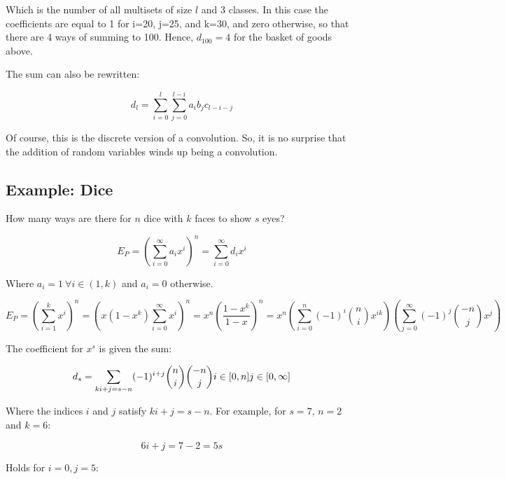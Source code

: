 Which is the number of all multisets of size $l$ and 3 classes. In this case the coefficients are equal to 1 for i=20, j=25, and k=30, and zero otherwise, so that there are 4 ways of summing to 100. Hence, $d_{100} = 4$ for the basket of goods above.

The sum can also be rewritten:

\begin{equation}
d_l = \sum^l_{i=0}\sum^{l-i}_{j=0} a_i b_j c_{l-i-j}
\end{equation}


Of course, this is the discrete version of a convolution. So, it is no surprise that the addition of random variables winds up being a convolution.


\subsection{Example: Dice}

How many ways are there for $n$ dice with $k$ faces to show $s$ eyes?

\begin{equation}
E_P = \left(\sum_{i=0}^\infty a_i x^i\right)^n = \sum_{i=0}^{\infty}d_i x^i
\end{equation}

Where $a_i = 1\ \forall i\in(1,k)$ and $a_i = 0$ otherwise.

\begin{equation}
E_P = \left(\sum_{i=1}^k x^i\right)^n = \left(x(1-x^k)\sum_{i=0}^\infty x^i\right)^n = x^n\left(\frac{1-x^k}{1-x}\right)^n = x^n \left(\sum_{i=0}^n (-1)^i {n \choose i} x^{ik}\right)\left(\sum_{j=0}^{\infty} (-1)^j {-n \choose j} x^j\right)
\end{equation}

The coefficient for $x^s$ is given the sum:

\begin{equation}
d_s = \sum_{ki+j=s-n} (-1)^{i+j}{n \choose i}{-n \choose j}\\
i \in [0,n] \\
j \in [0,\infty]
\end{equation}

Where the indices $i$ and $j$ satisfy $ki+j = s-n$. For example, for $s=7$, $n=2$ and $k=6$:

\begin{equation}
6i+j = 7-2 = 5s
\end{equation}

Holds for $i=0, j=5$:

